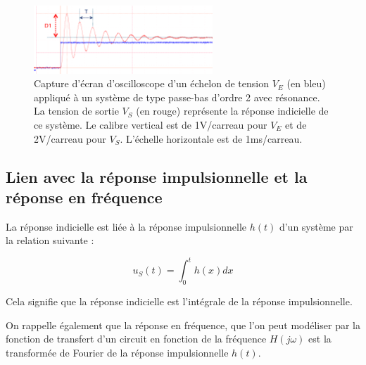 \begin{figure}[h!]
    \centering
	\includegraphics[width=0.6\textwidth]{images/ri_ordre2_bas_out_d1.png}
	
	\caption{Capture d'écran d'oscilloscope d'un échelon de tension $V_E$ (en bleu) appliqué à un système de type passe-bas d'ordre 2 avec résonance. La tension de sortie $V_S$ (en rouge) représente la réponse indicielle de ce système. Le calibre vertical est de 1V/carreau pour $V_E$ et de 2V/carreau pour $V_S$. L'échelle horizontale est de 1ms/carreau.}
    \label{fig:ordre2_dep}
\end{figure}



\subsection{Lien avec la réponse impulsionnelle et la réponse en fréquence}

La réponse indicielle est liée à la réponse impulsionnelle $h(t)$ d'un système par la relation suivante :

$$u_S(t) = \int_{0}^t h(x)dx$$

Cela signifie que la réponse indicielle est l'intégrale de la réponse impulsionnelle.

On rappelle également que la réponse en fréquence, que l'on peut modéliser par la fonction de transfert d'un circuit en fonction de la fréquence $H(j\omega)$ est la transformée de Fourier de la réponse impulsionnelle $h(t)$.